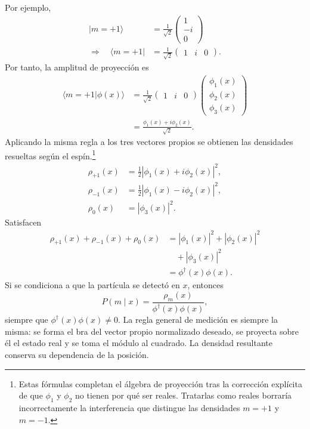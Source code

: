 Por ejemplo,
\begin{equation}
\begin{aligned}
|m=+1\rangle
&=
\frac{1}{\sqrt2}
\begin{pmatrix}
1\\
-i\\
0
\end{pmatrix}
\\
\Longrightarrow\quad\langle m=+1|
&=
\frac{1}{\sqrt2}
\begin{pmatrix}
1&i&0
\end{pmatrix}.
\end{aligned}
\end{equation}
Por tanto, la amplitud de proyección es
\begin{align}
\langle m=+1|\phi(x)\rangle
&=
\frac{1}{\sqrt2}
\begin{pmatrix}
1&i&0
\end{pmatrix}
\begin{pmatrix}
\phi_1(x)\\
\phi_2(x)\\
\phi_3(x)
\end{pmatrix}\\
&=
\frac{\phi_1(x)+i\phi_2(x)}{\sqrt2}.
\end{align}
Aplicando la misma regla a los tres vectores propios se obtienen las densidades resueltas según el espín.\footnote{Estas fórmulas completan el álgebra de proyección tras la corrección explícita de que \(\phi_1\) y \(\phi_2\) no tienen por qué ser reales. Tratarlas como reales borraría incorrectamente la interferencia que distingue las densidades \(m=+1\) y \(m=-1\).}
\begin{align}
\rho_{+1}(x)
&=
\frac12\left|\phi_1(x)+i\phi_2(x)\right|^2,\\
\rho_{-1}(x)
&=
\frac12\left|\phi_1(x)-i\phi_2(x)\right|^2,\\
\rho_0(x)
&=
|\phi_3(x)|^2.
\end{align}
Satisfacen
\begin{equation}
\begin{aligned}
\rho_{+1}(x)+\rho_{-1}(x)+\rho_0(x)
&=
|\phi_1(x)|^2+|\phi_2(x)|^2
\\
&\quad{}+|\phi_3(x)|^2
\\
&=
\phi^\dagger(x)\phi(x).
\end{aligned}
\end{equation}
Si se condiciona a que la partícula se detectó en \(x\), entonces
\begin{equation}
P(m\mid x)
=
\frac{\rho_m(x)}{\phi^\dagger(x)\phi(x)},
\end{equation}
siempre que \(\phi^\dagger(x)\phi(x)\neq0\). La regla general de medición es siempre la misma: se forma el bra del vector propio normalizado deseado, se proyecta sobre él el estado real y se toma el módulo al cuadrado. La densidad resultante conserva su dependencia de la posición.

